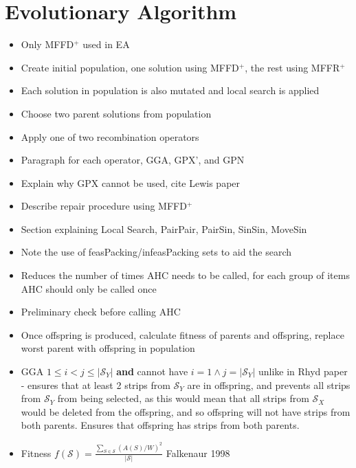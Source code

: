 \documentclass{elsarticle}
\begin{document}
\section{Evolutionary Algorithm}
\begin{itemize}
	\item Only MFFD$^+$ used in EA
	\item Create initial population, one solution using MFFD$^+$, the rest using MFFR$^+$
	\item Each solution in population is also mutated and local search is applied
	\item Choose two parent solutions from population
	\item Apply one of two recombination operators
	\item Paragraph for each operator, GGA, GPX', and GPN
	\item Explain why GPX cannot be used, cite Lewis paper
	\item Describe repair procedure using MFFD$^+$
	\item Section explaining Local Search, PairPair, PairSin, SinSin, MoveSin
	\item Note the use of feasPacking/infeasPacking sets to aid the search
	\item Reduces the number of times AHC needs to be called, for each group of items AHC should only be called once
	\item Preliminary check before calling AHC
	\item Once offspring is produced, calculate fitness of parents and offspring, replace worst parent with offspring in population
	\item GGA $1 \leq i < j \leq |\mathcal{S}_Y|$ \textbf{and} cannot have $i = 1 \land j = |\mathcal{S}_Y|$ unlike in Rhyd paper - ensures that at least 2 strips from $\mathcal{S}_Y$ are in offspring, and prevents all strips from $\mathcal{S}_Y$ from being selected, as this would mean that all strips from $\mathcal{S}_X$ would be deleted from the offspring, and so offspring will not have strips from both parents. Ensures that offspring has strips from both parents.
	\item Fitness $f(\mathcal{S}) = \frac{\sum_{S \in \mathcal{S}} (A(S)/W)^2}{|\mathcal{S}|}$ Falkenaur 1998
\end{itemize}
\end{document}
